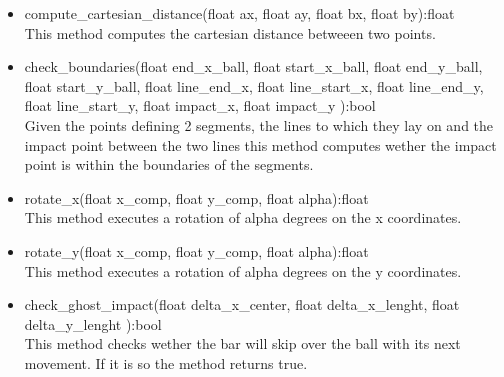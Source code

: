 \documentclass[]{article}
\begin{document}
\begin{itemize}
	\item compute\_cartesian\_distance(float ax, float ay, float bx, float by):float\\This method computes the cartesian distance betweeen two points.
	\item check\_boundaries(float end\_x\_ball, float start\_x\_ball, float end\_y\_ball, float start\_y\_ball, float line\_end\_x, float line\_start\_x, float line\_end\_y, float line\_start\_y, float impact\_x, float impact\_y ):bool \\ Given the points defining 2 segments, the lines to which they lay on and the impact point between the two lines this method computes wether the impact point is within the boundaries of the segments. 
	\item rotate\_x(float x\_comp, float y\_comp, float alpha):float \\This method executes a rotation of alpha degrees on the x coordinates.
	\item rotate\_y(float x\_comp, float y\_comp, float alpha):float\\This method executes a rotation of alpha degrees on the y coordinates.
	\item check\_ghost\_impact(float delta\_x\_center, float  delta\_x\_lenght, float delta\_y\_lenght ):bool \\This method checks wether the bar will skip over the ball with its next movement. If it is so the method returns true.
	\end{itemize}
\end{document}
